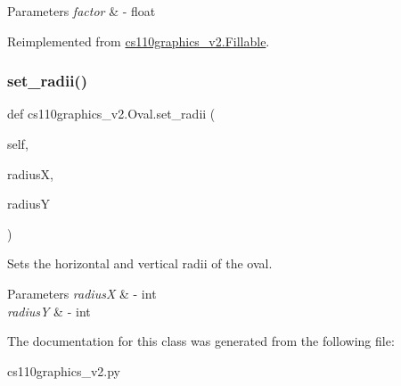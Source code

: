 \begin{DoxyParams}{Parameters}
{\em factor} & -\/ float \\
\hline
\end{DoxyParams}


Reimplemented from \mbox{\hyperlink{classcs110graphics__v2_1_1Fillable_af023a8511e9e9149214a3bf8e3a50aae}{cs110graphics\+\_\+v2.\+Fillable}}.

\mbox{\label{classcs110graphics__v2_1_1Oval_a0b233a4da55c8706bc24f9c513d2c213}} 
\subsubsection{\texorpdfstring{set\_radii()}{set\_radii()}}
{\footnotesize\ttfamily def cs110graphics\+\_\+v2.\+Oval.\+set\+\_\+radii (\begin{DoxyParamCaption}\item[{}]{self,  }\item[{}]{radiusX,  }\item[{}]{radiusY }\end{DoxyParamCaption})}



Sets the horizontal and vertical radii of the oval. 


\begin{DoxyParams}{Parameters}
{\em radiusX} & -\/ int \\
\hline
{\em radiusY} & -\/ int \\
\hline
\end{DoxyParams}


The documentation for this class was generated from the following file\+:\begin{DoxyCompactItemize}
\item 
cs110graphics\+\_\+v2.\+py\end{DoxyCompactItemize}
